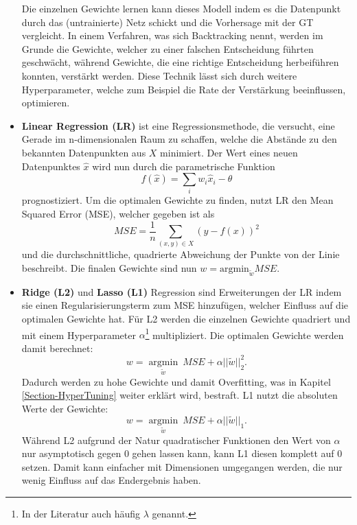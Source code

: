\begin{itemize}
    Die einzelnen Gewichte lernen kann dieses Modell indem es die Datenpunkt durch das (untrainierte) Netz
    schickt und die Vorhersage mit der GT vergleicht. In einem Verfahren, was sich Backtracking nennt, werden
    im Grunde die Gewichte, welcher zu einer falschen Entscheidung führten geschwächt, während Gewichte, die
    eine richtige Entscheidung herbeiführen konnten, verstärkt werden. Diese Technik lässt sich durch weitere
    Hyperparameter, welche zum Beispiel die Rate der Verstärkung beeinflussen, optimieren.

   \item \textbf{Linear Regression (LR)} ist eine Regressionsmethode, die versucht, eine Gerade im
    n-dimensionalen Raum zu schaffen, welche die Abstände zu den bekannten Datenpunkten aus $X$ minimiert. Der
    Wert eines neuen Datenpunktes $\hat{x}$ wird nun durch die parametrische Funktion
    \begin{equation}
        f(\hat{x}) = \sum_i w_i\hat{x}_i - \theta
    \end{equation}
    prognostiziert. Um die optimalen Gewichte zu finden, nutzt LR den Mean
    Squared Error (MSE), welcher gegeben ist als
    \begin{equation}
        MSE = \frac{1}{n} \sum_{(x,y) \in X}(y-f(x))^2
    \end{equation}
    und die durchschnittliche, quadrierte Abweichung der Punkte von der Linie beschreibt. Die finalen
    Gewichte sind nun $w = \text{argmin}_{\tilde{w}} MSE$.

   \item \textbf{Ridge (L2)} und \textbf{Lasso (L1)} Regression sind Erweiterungen der LR indem sie einen
    Regularisierungsterm zum MSE hinzufügen, welcher Einfluss auf die optimalen Gewichte hat. Für L2 werden
    die einzelnen Gewichte quadriert und mit einem Hyperparameter $\alpha$\footnote{In der Literatur auch
    häufig $\lambda$ genannt.} multipliziert. Die optimalen Gewichte werden
    damit berechnet: 
    \begin{equation}
        w = \underset{\tilde{w}}{\operatorname{argmin}}\ MSE + \alpha||\tilde{w}||_2^2.
    \end{equation}
    Dadurch werden zu hohe Gewichte und damit Overfitting, was in Kapitel \ref{Section-HyperTuning} weiter
    erklärt wird, bestraft. L1 nutzt die absoluten Werte der Gewichte:
    \begin{equation}
        w = \underset{\tilde{w}}{\operatorname{argmin}}\ MSE + \alpha||\tilde{w}||_1.
    \end{equation}
    Während L2 aufgrund der Natur quadratischer Funktionen den Wert von $\alpha$ nur asymptotisch gegen $0$ gehen
    lassen kann, kann L1 diesen komplett auf $0$ setzen. Damit kann einfacher mit Dimensionen umgegangen werden,
    die nur wenig Einfluss auf das Endergebnis haben.

\end{itemize}

